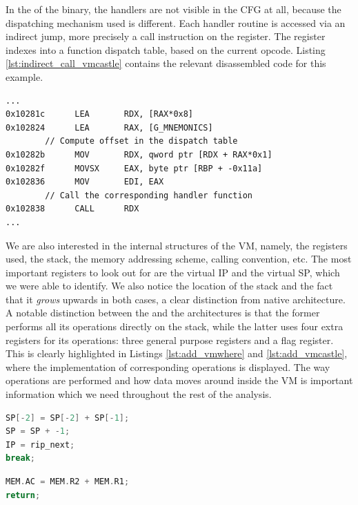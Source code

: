 In the of the  binary, the handlers are not visible in the \gls{CFG} at all, because the dispatching mechanism used is different. Each handler routine is accessed via an indirect jump, more precisely a call instruction on the  register. The  register indexes into a function dispatch table, based on the current opcode. Listing \ref{lst:indirect_call_vmcastle} contains the relevant disassembled code for this example.

\begin{lstlisting}[label={lst:indirect_call_vmcastle}, caption={x86\_64 disassembly of the \cc{vmcastle} dispatcher. The function handler corresponding to the current opcode is indirectly called through the register \cc{RDX}.}]
...
0x10281c      LEA       RDX, [RAX*0x8]
0x102824      LEA       RAX, [G_MNEMONICS]
        // Compute offset in the dispatch table
0x10282b      MOV       RDX, qword ptr [RDX + RAX*0x1] 
0x10282f      MOVSX     EAX, byte ptr [RBP + -0x11a]
0x102836      MOV       EDI, EAX
        // Call the corresponding handler function
0x102838      CALL      RDX  
...
\end{lstlisting}

We are also interested in the internal structures of the \gls{VM}, namely, the registers used, the stack, the memory addressing scheme, calling convention, etc. The most important registers to look out for are the virtual \gls{IP} and the virtual \gls{SP}, which we were able to identify. We also notice the location of the stack and the fact that it \emph{grows} upwards in both cases, a clear distinction from native  architecture. A notable distinction between the  and the  architectures is that the former performs all its operations directly on the stack, while the latter uses four extra registers for its operations: three general purpose registers and a flag register. This is clearly highlighted in Listings \ref{lst:add_vmwhere} and \ref{lst:add_vmcastle}, where the implementation of corresponding  operations is displayed. The way operations are performed and how data moves around inside the \gls{VM} is important information which we need throughout the rest of the analysis.

\begin{multicols}{2}
    \begin{lstlisting}[language=c, label={lst:add_vmwhere}, caption={Stack-based implementation of a simple \cc{add} instruction in the \cc{vmwhere} architecture.}]
SP[-2] = SP[-2] + SP[-1];
SP = SP + -1;
IP = rip_next;
break;
\end{lstlisting}
\columnbreak
\begin{lstlisting}[language=c, label={lst:add_vmcastle}, caption={Register-based implementation of a simple \cc{add} instruction in the \cc{vmcastle} architecture.}]
MEM.AC = MEM.R2 + MEM.R1;
return;
\end{lstlisting}
\end{multicols}

